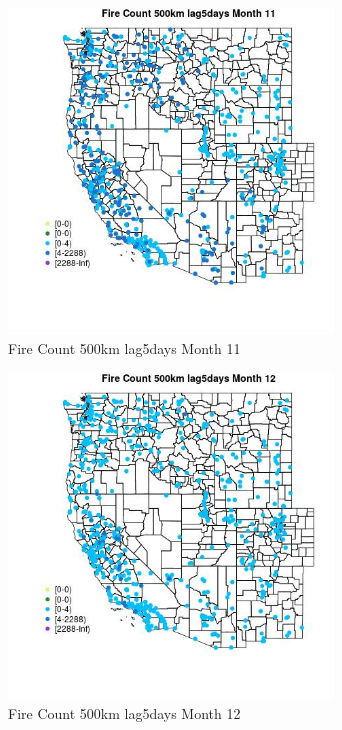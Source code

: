 \begin{figure} 
\centering  
\includegraphics[width=0.77\textwidth]{Code_Outputs/Report_ML_input_PM25_Step4_part_e_de_duplicated_aves_compiled_2019-05-21wNAs_MapObsMo11Fire_Count_500km_lag5days.jpg} 
\caption{\label{fig:Report_ML_input_PM25_Step4_part_e_de_duplicated_aves_compiled_2019-05-21wNAsMapObsMo11Fire_Count_500km_lag5days}Fire Count 500km lag5days Month 11} 
\end{figure} 
 

\clearpage 

\begin{figure} 
\centering  
\includegraphics[width=0.77\textwidth]{Code_Outputs/Report_ML_input_PM25_Step4_part_e_de_duplicated_aves_compiled_2019-05-21wNAs_MapObsMo12Fire_Count_500km_lag5days.jpg} 
\caption{\label{fig:Report_ML_input_PM25_Step4_part_e_de_duplicated_aves_compiled_2019-05-21wNAsMapObsMo12Fire_Count_500km_lag5days}Fire Count 500km lag5days Month 12} 
\end{figure} 
 

